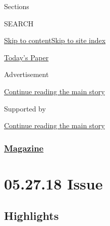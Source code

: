 Sections

SEARCH

\protect\hyperlink{site-content}{Skip to
content}\protect\hyperlink{site-index}{Skip to site index}

\href{https://myaccount.nytimes3xbfgragh.onion/auth/login?response_type=cookie\&client_id=vi}{}

\href{https://www.nytimes3xbfgragh.onion/section/todayspaper}{Today's
Paper}

Advertisement

\protect\hyperlink{after-top}{Continue reading the main story}

Supported by

\protect\hyperlink{after-sponsor}{Continue reading the main story}

\hypertarget{magazine}{%
\subsubsection{\texorpdfstring{\href{/section/magazine}{Magazine}}{Magazine}}\label{magazine}}

\hypertarget{052718-issue}{%
\section{05.27.18 Issue}\label{052718-issue}}

\hypertarget{highlights}{%
\subsection{Highlights}\label{highlights}}

